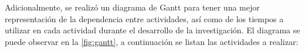 

	Adicionalmente, se realizó un diagrama de Gantt para tener una mejor representación de la dependencia entre actividades, así como de los tiempos a utilizar en cada actividad durante el desarrollo de la investigación. El diagrama se puede observar en la \cref{fig:gantt}, a continuación se listan las actividades a realizar:

